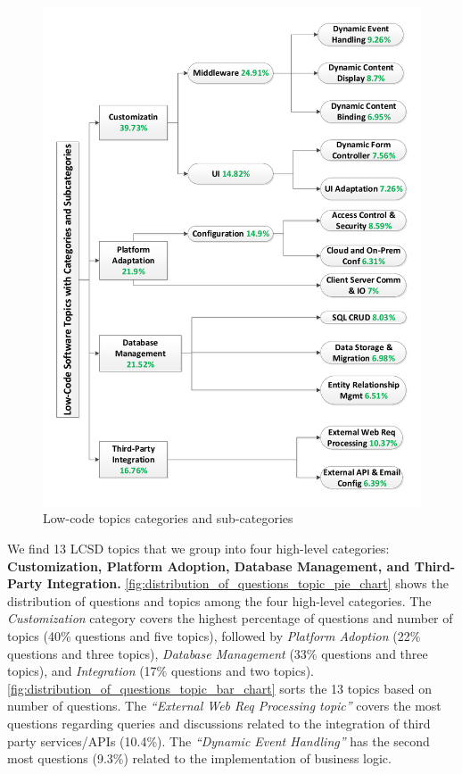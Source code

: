 \begin{figure}[t]
\centering
\includegraphics[scale=0.48]{res/TM_taxonomy.pdf}
\caption{ Low-code topics categories and sub-categories}
\label{fig:taxonomy_TM}
\end{figure}




We find 13 LCSD topics that we group into four high-level categories: \textbf{Customization, Platform Adoption, Database Management, and Third-Party Integration.} \fig\ref{fig:distribution_of_questions_topic_pie_chart} shows the distribution of
questions and topics among the four high-level categories. The \textit{Customization} category 
covers the highest percentage of questions
and number of topics (40\% questions and five topics), followed by \textit{ Platform Adoption} (22\%
questions and three topics), \textit{Database Management} (33\% questions and three topics), and \textit{Integration}
(17\% questions and two topics). \fig\ref{fig:distribution_of_questions_topic_bar_chart} sorts the 13 topics based on number of questions. The
\textit{``External Web Req Processing topic''} covers the most questions regarding queries and discussions related
to the integration of third party services/APIs (10.4\%). The \textit{``Dynamic Event Handling''} has the second most questions (9.3\%) related to the implementation of business logic.

